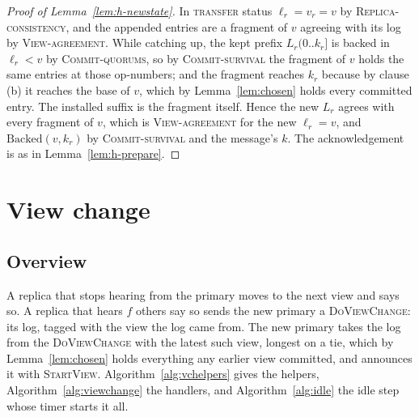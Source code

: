 \documentclass[11pt,a4paper]{article}
\theoremstyle{plain}
\theoremstyle{definition}
\theoremstyle{remark}
\newcommand{\msg}[1]{\textsc{#1}}
\newcommand{\dvc}{\msg{DoViewChange}}
\newcommand{\Backed}{\mathrm{Backed}}
\newcommand{\transfer}{\textsc{transfer}}
\newcommand{\Local}{\textsc{Replica-consistency}}
\newcommand{\OneLog}{\textsc{View-agreement}}
\newcommand{\CommitsBacked}{\textsc{Commit-quorums}}
\newcommand{\Survival}{\textsc{Commit-survival}}
\begin{document}
\begin{proof}[Proof of Lemma~\ref{lem:h-newstate}]
In \transfer{} status $\ell_r = v_r = v$ by \Local, and the appended
entries are a fragment of $v$ agreeing with its log by \OneLog. While
catching up, the kept prefix $L_r(0{..}k_r]$ is backed in $\ell_r < v$ by
\CommitsBacked, so by \Survival{} the fragment of $v$ holds the same
entries at those op-numbers; and the fragment reaches $k_r$ because by
clause (b) it reaches the base of $v$, which by Lemma~\ref{lem:chosen}
holds every committed entry. The installed suffix is the fragment
itself. Hence the new $L_r$ agrees with every fragment of $v$, which is
\OneLog{} for the new $\ell_r = v$, and $\Backed(v, k_r)$ by
\Survival{} and the message's $k$. The acknowledgement is as in
Lemma~\ref{lem:h-prepare}.
\end{proof}

\section{View change}
\label{sec:viewchange}

\subsection{Overview}

A replica that stops hearing from the primary moves to the next view and
says so. A replica that hears $f$ others say so sends the new primary a
\dvc{}: its log, tagged with the view the log came from. The new primary
takes the log from the \dvc{} with the latest such view, longest on a
tie,
which by Lemma~\ref{lem:chosen} holds everything any earlier view
committed, and announces it with \msg{StartView}.
Algorithm~\ref{alg:vchelpers} gives the helpers,
Algorithm~\ref{alg:viewchange} the handlers, and Algorithm~\ref{alg:idle}
the idle step whose timer starts it all.
\end{document}
